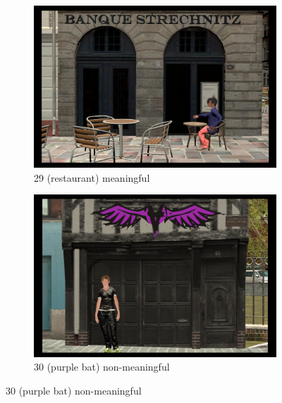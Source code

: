 \begin{figure}[!htb]
	\centering
	\begin{subfigure}[b]{0.48\linewidth}
		\includegraphics[width=\linewidth]{figures/starting_locations_appx/29_S(restaurant)_A.PNG}
		\caption{29 (restaurant) meaningful}
		\label{fig:29_S(restaurant)_A}
	\end{subfigure}
	\begin{subfigure}[b]{0.48\linewidth}
		\includegraphics[width=\linewidth]{figures/starting_locations_appx/30_R(purpul bat)_A.PNG}
		\caption{30 (purple bat) non-meaningful}
		\label{fig:30_R(purpul bat)_A}
	\end{subfigure}


\end{figure}
